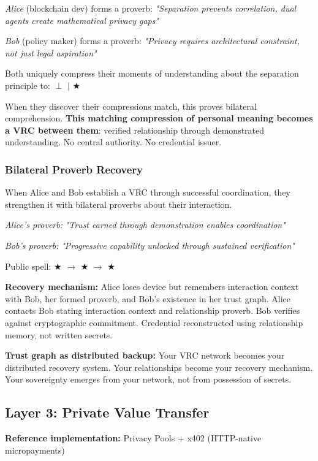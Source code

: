 \documentclass[11pt,a4paper]{article}
\theoremstyle{definition}
\begin{document}
\textit{Alice} (blockchain dev) forms a proverb: \textit{"Separation prevents correlation, dual agents create mathematical privacy gaps"}

\textit{Bob} (policy maker) forms a proverb: \textit{"Privacy requires architectural constraint, not just legal aspiration"}

Both uniquely compress their moments of understanding about the separation principle to: $\perp$ $|$ $\bigstar$

When they discover their compressions match, this proves bilateral comprehension. \textbf{This matching compression of personal meaning becomes a VRC between them}: verified relationship through demonstrated understanding. No central authority. No credential issuer.

\subsubsection{Bilateral Proverb Recovery}

When Alice and Bob establish a VRC through successful coordination, they strengthen it with bilateral proverbs about their interaction.

\textit{Alice's proverb:} \textit{"Trust earned through demonstration enables coordination"}

\textit{Bob's proverb:} \textit{"Progressive capability unlocked through sustained verification"}

Public spell: $\bigstar$ $\rightarrow$ $\bigstar$ $\rightarrow$ $\bigstar$

\textbf{Recovery mechanism:} Alice loses device but remembers interaction context with Bob, her formed proverb, and Bob's existence in her trust graph. Alice contacts Bob stating interaction context and relationship proverb. Bob verifies against cryptographic commitment. Credential reconstructed using relationship memory, not written secrets.

\textbf{Trust graph as distributed backup:} Your VRC network becomes your distributed recovery system. Your relationships become your recovery mechanism. Your sovereignty emerges from your network, not from possession of secrets.

\subsection{Layer 3: Private Value Transfer}

\textbf{Reference implementation:} Privacy Pools + x402 (HTTP-native micropayments)
\end{document}
